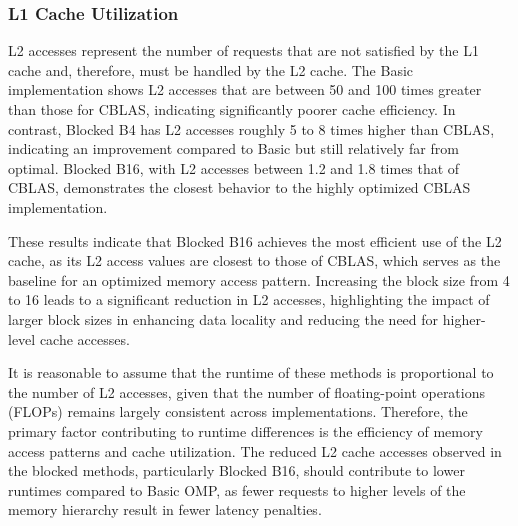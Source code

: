 \subsubsection{L1 Cache Utilization}
\label{subsubsec:memory-hierarchy-utilization-l2}

L2 accesses represent the number of requests that are not satisfied by the L1 cache and, therefore, must be handled by the L2 cache. The Basic implementation shows L2 accesses that are between 50 and 100 times greater than those for CBLAS, indicating significantly poorer cache efficiency. In contrast, Blocked B4 has L2 accesses roughly 5 to 8 times higher than CBLAS, indicating an improvement compared to Basic but still relatively far from optimal. Blocked B16, with L2 accesses between 1.2 and 1.8 times that of CBLAS, demonstrates the closest behavior to the highly optimized CBLAS implementation.

These results indicate that Blocked B16 achieves the most efficient use of the L2 cache, as its L2 access values are closest to those of CBLAS, which serves as the baseline for an optimized memory access pattern. Increasing the block size from 4 to 16 leads to a significant reduction in L2 accesses, highlighting the impact of larger block sizes in enhancing data locality and reducing the need for higher-level cache accesses.

It is reasonable to assume that the runtime of these methods is proportional to the number of L2 accesses, given that the number of floating-point operations (FLOPs) remains largely consistent across implementations. Therefore, the primary factor contributing to runtime differences is the efficiency of memory access patterns and cache utilization. The reduced L2 cache accesses observed in the blocked methods, particularly Blocked B16, should contribute to lower runtimes compared to Basic OMP, as fewer requests to higher levels of the memory hierarchy result in fewer latency penalties.

